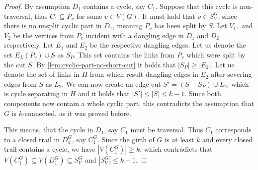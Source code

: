 \begin{proof}
	By assumption $D_1$ contains a cycle, say $C_1$. Suppose that this cycle is non-traversal, thus $C_1\subseteq P_v$ for some $v\in V(G)$. It must hold that $v\in S_V^G$, since there is no unsplit cyclic part in $D_1$, meaning $P_v$ has been split by $S$. Let $V_1,$ and $V_2$ be the vertices from $P_v$ incident with a dangling edge in $D_1$ and $D_2$ respectively. Let $E_1$ and $E_2$ be the respective dangling edges. Let us denote the set $E_L(P_v)\cup S$ as $S_P$. This set contains the links from $P_v$ which were split by the cut $S$. By \cref{lem:cyclic-part-no-short-cut} it holds that $|S_P|\geq|E_2|$. Let us denote the set of links in $H$ from which result dangling edges in $E_2$ after severing edges from $S$ as $L_2$. We can now create an edge cut $S'=(S-S_P)\cup L_2$, which is cycle separating in $H$ and it holds that $|S'|\leq |S|\leq k-1$. Since both components now contain a whole cyclic part, this contradicts the assumption that $G$ is $k$-connected, as it was proved before.
	
	This means, that the cycle in $D_1$, say $C_1$ must be traversal. Thus $C_1$ corresponds to a closed trail in $D_1^G$, say $C_1^G$. Since the girth of $G$ is at least $k$ and every closed trail contains a cycle, we have $|V(C_1^G)|\geq k$, which contradicts that $V(C_1^G)\subseteq V(D_1^G)\subseteq S_V^G$ and $|S_V^G|\leq k-1$.
	
\end{proof}
